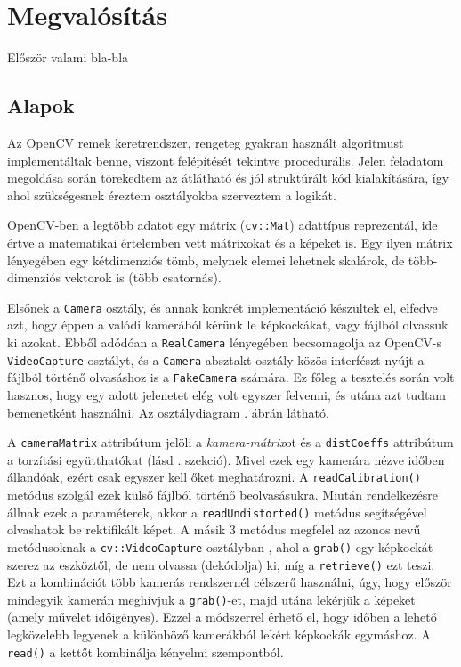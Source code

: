 \chapter{Megvalósítás}

{\color{red} Először valami bla-bla}



\section{Alapok}



Az OpenCV remek keretrendszer, rengeteg gyakran használt algoritmust implementáltak benne, viszont felépítését tekintve procedurális. Jelen feladatom megoldása során törekedtem az átlátható és jól struktúrált kód kialakítására, így ahol szükségesnek éreztem osztályokba szerveztem a logikát.

OpenCV-ben a legtöbb adatot egy mátrix (\texttt{cv::Mat}) adattípus reprezentál, ide értve a matematikai értelemben vett mátrixokat és a képeket is. Egy ilyen mátrix lényegében egy kétdimenziós tömb, melynek elemei lehetnek skalárok, de több-dimenziós vektorok is (több csatornás).

Elsőnek a \texttt{Camera} osztály, és annak konkrét implementáció készültek el, elfedve azt, hogy éppen a valódi kamerából kérünk le képkockákat, vagy fájlból olvassuk ki azokat. Ebből adódóan a \texttt{RealCamera} lényegében becsomagolja az OpenCV-s \texttt{VideoCapture} osztályt, és a \texttt{Camera} absztakt osztály közös interfészt nyújt a fájlból történő olvasáshoz is a \texttt{FakeCamera} számára. Ez főleg a tesztelés során volt hasznos, hogy egy adott jelenetet elég volt egyszer felvenni, és utána azt tudtam bemenetként használni. Az osztálydiagram . ábrán látható.

A \texttt{cameraMatrix} attribútum jelöli a \textit{kamera-mátrix}ot és a \texttt{distCoeffs} attribútum a torzítási együtthatókat (lásd . szekció). Mivel ezek egy kamerára nézve időben állandóak, ezért csak egyszer kell őket meghatározni. A \texttt{readCalibration()} metódus szolgál ezek külső fájlból történő beolvasásukra. Miután rendelkezésre állnak ezek a paraméterek, akkor a \texttt{readUndistorted()} metódus segítségével olvashatok be rektifikált képet. A másik 3 metódus megfelel az azonos nevű metódusoknak a \texttt{cv::VideoCapture} osztályban \cite{cv_video}, ahol a \texttt{grab()} egy képkockát szerez az eszköztől, de nem olvassa (dekódolja) ki, míg a \texttt{retrieve()} ezt teszi. Ezt a kombinációt több kamerás rendszernél célszerű használni, úgy, hogy először mindegyik kamerán meghívjuk a \texttt{grab()}-et, majd utána lekérjük a képeket (amely művelet időigényes). Ezzel a módszerrel érhető el, hogy időben a lehető legközelebb legyenek a különböző kamerákból lekért képkockák egymáshoz. A \texttt{read()} a kettőt kombinálja kényelmi szempontból.

